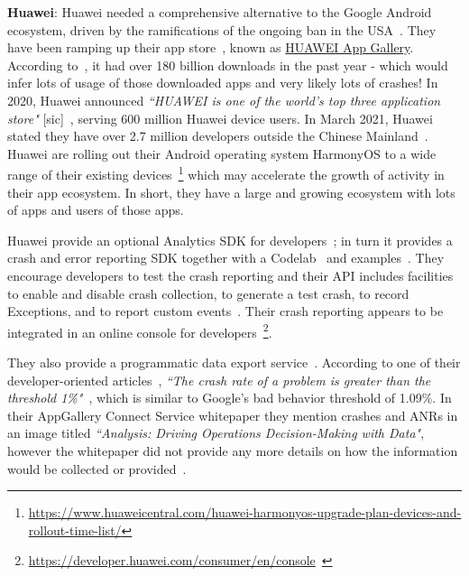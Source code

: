 \textbf{Huawei}: 
Huawei needed a comprehensive alternative to the Google Android ecosystem, driven by the ramifications of the ongoing ban in the USA~\citep{androidauthority2021_the_huawei_ban}. 
They have been ramping up their app store~\citep{androidauthority2021_huawei_app_gallery}, known as \href{https://appgallery.huawei.com/}{HUAWEI App Gallery}. According to~\citep{vodafone2021_huawei_appgallery}, it had over 180 billion downloads in the past year - which would infer lots of usage of those downloaded apps and very likely lots of crashes! 
%
In 2020, Huawei announced \emph{``HUAWEI is one of the world's top three application store"} [sic]~\citep{huawei2020_press_release_on_hms_ecosystem}, serving 600 million Huawei device users. In March 2021, Huawei stated they have over 2.7 million developers outside the Chinese Mainland~\citep{}. 
Huawei are rolling out their Android operating system HarmonyOS to a wide range of their existing devices~\footnote{\url{https://www.huaweicentral.com/huawei-harmonyos-upgrade-plan-devices-and-rollout-time-list/}} which may accelerate the growth of activity in their app ecosystem. In short, they have a large and growing ecosystem with lots of apps and users of those apps.

Huawei provide an optional Analytics SDK for developers~\citep{huawei_analyticskit}; in turn it provides a crash and error reporting SDK together with a Codelab~\citep{huawei_crashservice_codelab} and examples~\citep{huawei_crashservice_github_examples}. They encourage developers to test the crash reporting and their API includes facilities to enable and disable crash collection, to generate a test crash, to record Exceptions, and to report custom events~\citep{huawei_ag_connect_crash}. 
Their crash reporting appears to be integrated in an online console for developers~\footnote{\url{https://developer.huawei.com/consumer/en/console}~\citep{huawei_introduction_to_appgallery_connect_crash_service}}. 

They also provide a programmatic data export service~\citep{huawei_analyticskit_dataexport_codelab}. According to one of their developer-oriented articles~\citep{huawei_introduction_to_appgallery_connect_crash_service}, \emph{``The crash rate of a problem is greater than the threshold 1\%"}~\citep{huawei_introduction_to_appgallery_connect_crash_service}, which is similar to Google's bad behavior threshold of 1.09\%. In their AppGallery Connect Service whitepaper they mention crashes and ANRs in an image titled \emph{``Analysis: Driving Operations Decision-Making with Data"}, however the whitepaper did not provide any more details on how the information would be collected or provided~\citep{huawei_appgallery_connect_service_whitepaper}. 


